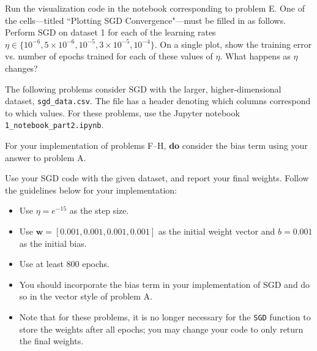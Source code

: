 \begin{problem}[6]
Run the visualization code in the notebook corresponding to problem E.
One of the cells---titled ``Plotting SGD Convergence"---must be filled in as follows.
Perform SGD on dataset 1 for each of the learning rates $\eta \in \{10^{-6}, 5\times10^{-6}, 10^{-5}, 3\times 10^{-5}, 10^{-4}\}$.
On a single plot, show the training error vs. number of epochs trained for each of these values of $\eta$.
What happens as $\eta$ changes?
\end{problem}

\begin{solution}

\end{solution}


The following problems consider SGD with the larger, higher-dimensional dataset, \texttt{sgd_data.csv}.
The file has a header denoting which columns correspond to which values.
For these problems, use the Jupyter notebook \texttt{1_notebook_part2.ipynb}.

For your implementation of problems F--H, \textbf{do} consider the bias term using your answer to problem A.

\begin{problem}[6]
Use your SGD code with the given dataset, and report your final weights.
Follow the guidelines below for your implementation:

\begin{itemize}
	\item Use $\eta = e^{-15}$ as the step size.
	\item Use $\mathbf{w} = [0.001, 0.001, 0.001, 0.001]$ as the initial weight vector and $b = 0.001$ as the initial bias.
	\item Use at least 800 epochs.
	\item You should incorporate the bias term in your implementation of SGD and do so in the vector style of problem A.
	\item Note that for these problems, it is no longer necessary for the \texttt{SGD} function to store the weights after all epochs; you may change your code to only return the final weights.
\end{itemize}
\end{problem}
\begin{solution}
\end{solution}

